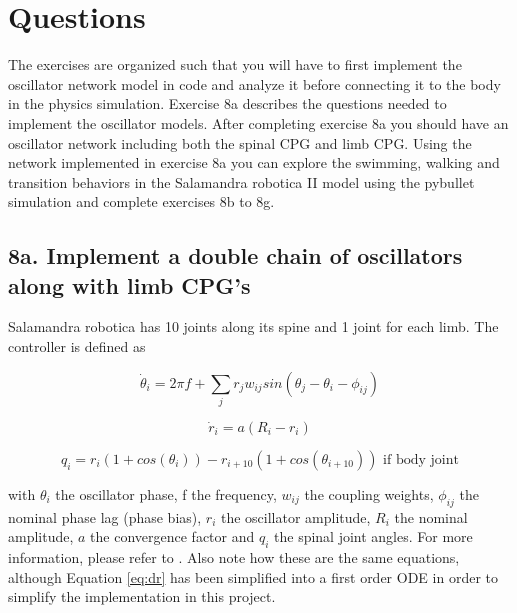 \documentclass{cmc}
\begin{document}
\newpage

\section*{Questions}

The exercises are organized such that you will have to first implement the
oscillator network model in  code and analyze it before
connecting it to the body in the physics simulation.  Exercise 8a describes the
questions needed to implement the oscillator models. After completing exercise
8a you should have an oscillator network including both the spinal CPG and limb
CPG. Using the network implemented in exercise 8a you can explore the swimming,
walking and transition behaviors in the Salamandra robotica II model using the
pybullet simulation and complete exercises 8b to 8g.

\subsection*{8a. Implement a double chain of oscillators along with
  limb CPG's}
\label{sec:implement-chain}

Salamandra robotica has 10 joints along its spine and 1 joint for each
limb. The controller is defined as

\begin{equation}
  \label{eq:dphase}
  \dot{\theta}_i = 2 \pi f + \sum_j r_j w_{ij} sin(\theta_j - \theta_i - \phi_{ij})
\end{equation}

\begin{equation}
  \label{eq:dr}
  \dot{r}_i = a (R_i - r_i)
\end{equation}

\begin{equation}
  \label{eq:output}
  q_i = r_i(1 + cos(\theta_i)) - r_{i+10}(1 + cos(\theta_{i+10})) \text{ if body joint}
\end{equation}

with $ \theta_i $ the oscillator phase, f the frequency, $ w_{ij} $ the coupling
weights, $ \phi_{ij} $ the nominal phase lag (phase bias), $ r_i $ the
oscillator amplitude, $ R_i $ the nominal amplitude, $ a $ the convergence
factor and $ q_i $ the spinal joint angles. For more information, please refer
to \cite{ijspeert2007swimming}. Also note how these are the same equations,
although Equation \eqref{eq:dr} has been simplified into a first order ODE in
order to simplify the implementation in this project.
\end{document}
